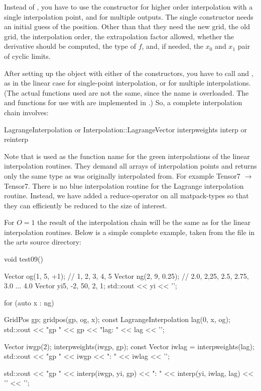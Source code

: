 Instead of , you have to use the constructor
 for higher order interpolation
with a single interpolation point, and 
for multiple outputs. The single constructor needs an
initial guess of the position.  Other than that they need the new grid,
the old grid, the interpolation order, the extrapolation factor allowed,
whether the derivative should be computed, the type of $f$, and, if needed,
the $x_0$ and $x_1$ pair of cyclic limits.

After setting up the  object with
either of the constructors, you have to call 
and , as in the linear case for single-point interpolation,
or  for multiple interpolations. (The actual
functions used are not the same, since the name is overloaded. The
 and  functions for use
with  are implemented in
.) So, a complete interpolation chain
involves:

\begin{code}
LagrangeInterpolation or Interpolation::LagrangeVector
interpweights
interp or reinterp
\end{code}

Note that  is used as the function name 
for the green interpolations of the linear interpolation routines.
They demand all arrays of interpolation points and returns only the
same type as was originally interpolated from.  For example Tensor7 $\rightarrow$ Tensor7.
There is no blue interpolation routine for the Lagrange interpolation
routine.  Instead, we have added a reduce-operator on all matpack-types
so that they can efficiently be reduced to the size of interest.

For $O=1$ the result of the
interpolation chain will be the same as for the linear interpolation
routines. Below is a simple complete example, taken from
the file  in the arts source directory: 

\begin{code}
void test09() {
  Vector og(1, 5, +1);    // 1, 2, 3, 4, 5
  Vector ng(2, 9, 0.25);  // 2.0, 2,25, 2.5, 2.75, 3.0 ... 4.0
  Vector yi{5, -2, 50, 2, 1};
  std::cout << yi << '\n';

  for (auto x : ng) {
    GridPos gp;
    gridpos(gp, og, x);
    const LagrangeInterpolation lag(0, x, og);
    std::cout << "gp " << gp << "lag: " << lag << '\n';

    Vector iwgp(2);
    interpweights(iwgp, gp);
    const Vector iwlag = interpweights(lag);
    std::cout << "gp " << iwgp << "\nlag: " << iwlag << '\n';

    std::cout << "gp " << interp(iwgp, yi, gp)
              << "\nlag: " << interp(yi, iwlag, lag) << '\n'
              << '\n';
  }
}
\end{code}

